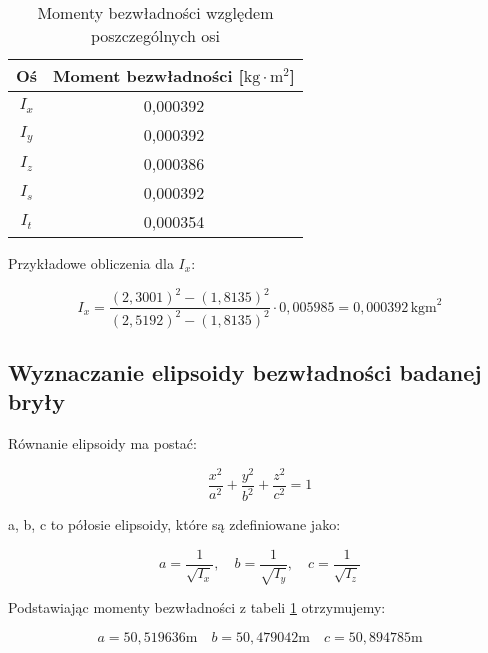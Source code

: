 \documentclass[a4paper,12pt]{article}
\begin{document}
\begin{table}[H]
    \centering
    \begin{tabular}{|c|c|}
        \hline
        Oś & Moment bezwładności [$\text{kg}\cdot\text{m}^2$] \\
        \hline
        $I_x$ & 0,000392 \\
        $I_y$ & 0,000392 \\
        $I_z$ & 0,000386 \\
        $I_s$ & 0,000392 \\
        $I_t$ & 0,000354 \\
        \hline
    \end{tabular}
    \caption{Momenty bezwładności względem poszczególnych osi}
    \label{tab:momenty_bezwladnosci}
\end{table}

Przykładowe obliczenia dla $I_x$:

\begin{equation*}
    I_x = \frac{(2,3001)^2 - (1,8135)^2}{(2,5192)^2 - (1,8135)^2} \cdot 0,005985 = 0,000392\,\text{kgm}^2
\end{equation*}



\subsection{Wyznaczanie elipsoidy bezwładności badanej bryły}


Równanie elipsoidy ma postać:

\begin{equation} \label{eq:elipsoida_bezwladnosci}
    \frac{x^2}{a^2} + \frac{y^2}{b^2} + \frac{z^2}{c^2} = 1
\end{equation}

a, b, c to półosie elipsoidy, które są zdefiniowane jako:

\begin{equation*}
    a = \frac{1}{\sqrt{I_x}}, \quad
    b = \frac{1}{\sqrt{I_y}}, \quad
    c = \frac{1}{\sqrt{I_z}}
\end{equation*}

Podstawiając momenty bezwładności z tabeli \ref{tab:momenty_bezwladnosci} otrzymujemy:

\begin{equation*}
    a=50,519636 \text{m} \quad
    b=50,479042 \text{m} \quad
    c=50,894785 \text{m}
\end{equation*}
\end{document}
